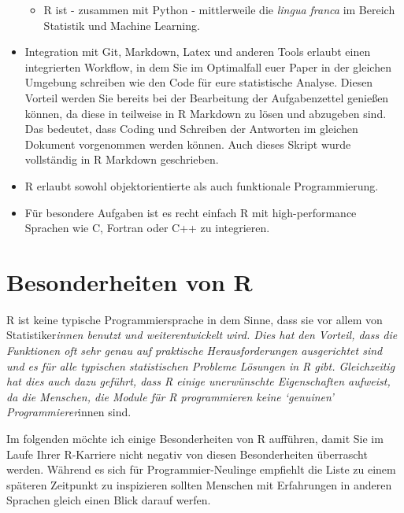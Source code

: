 \documentclass[]{book}
\providecommand{\tightlist}{%
  \setlength{\itemsep}{0pt}\setlength{\parskip}{0pt}}
\begin{document}
\begin{itemize}
  \begin{itemize}
  \tightlist
  \item
    R ist - zusammen mit Python - mittlerweile die \emph{lingua franca}
    im Bereich Statistik und Machine Learning.
  \end{itemize}
\item
  Integration mit Git, Markdown, Latex und anderen Tools erlaubt einen
  integrierten Workflow, in dem Sie im Optimalfall euer Paper in der
  gleichen Umgebung schreiben wie den Code für eure statistische
  Analyse. Diesen Vorteil werden Sie bereits bei der Bearbeitung der
  Aufgabenzettel genießen können, da diese in teilweise in R Markdown zu
  lösen und abzugeben sind. Das bedeutet, dass Coding und Schreiben der
  Antworten im gleichen Dokument vorgenommen werden können. Auch dieses
  Skript wurde vollständig in R Markdown geschrieben.
\item
  R erlaubt sowohl objektorientierte als auch funktionale
  Programmierung.
\item
  Für besondere Aufgaben ist es recht einfach R mit high-performance
  Sprachen wie C, Fortran oder C++ zu integrieren.
\end{itemize}

\section{Besonderheiten von R}\label{besonderheiten-von-r}

R ist keine typische Programmiersprache in dem Sinne, dass sie vor allem
von Statistiker\emph{innen benutzt und weiterentwickelt wird. Dies hat
den Vorteil, dass die Funktionen oft sehr genau auf praktische
Herausforderungen ausgerichtet sind und es für alle typischen
statistischen Probleme Lösungen in R gibt. Gleichzeitig hat dies auch
dazu geführt, dass R einige unerwünschte Eigenschaften aufweist, da die
Menschen, die Module für R programmieren keine `genuinen'
Programmierer}innen sind.

Im folgenden möchte ich einige Besonderheiten von R aufführen, damit Sie
im Laufe Ihrer R-Karriere nicht negativ von diesen Besonderheiten
überrascht werden. Während es sich für Programmier-Neulinge empfiehlt
die Liste zu einem späteren Zeitpunkt zu inspizieren sollten Menschen
mit Erfahrungen in anderen Sprachen gleich einen Blick darauf werfen.
\end{document}
